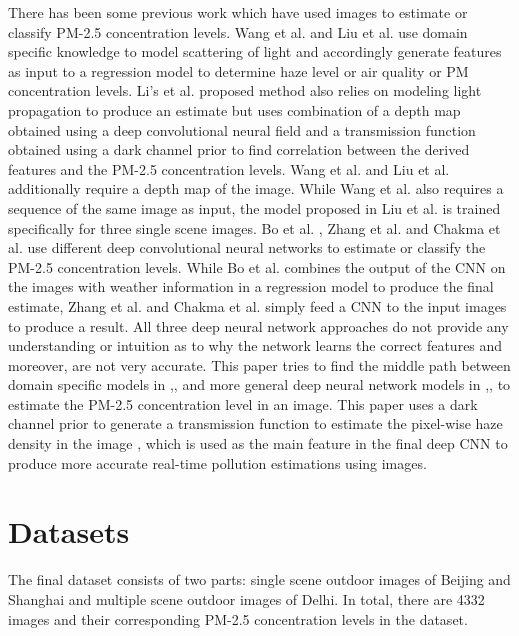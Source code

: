 \documentclass{article}
\begin{document}
There has been some previous work which have used images to estimate or classify PM-2.5 concentration levels. Wang et al. \cite{realtime} and Liu et al. \cite{PP} use domain specific knowledge to model scattering of light and accordingly generate features as input to a regression model to determine haze level or air quality or PM concentration levels. Li’s et al. \cite{Usergen} proposed method also relies on modeling light propagation to produce an estimate but uses combination of a depth map obtained using a deep convolutional neural field and a transmission function obtained using a dark channel prior to find correlation between the derived features and the PM-2.5 concentration levels. Wang et al. \cite{realtime} and Liu et al. \cite{PP} additionally require a depth map of the image. While Wang et al. \cite{realtime} also requires a sequence of the same image as input, the model proposed in Liu et al. \cite{PP} is trained specifically for three single scene images. Bo et al. \cite{PPconv}, Zhang et al. \cite{EAPconv} and Chakma et al. \cite{IBAQconv} use different deep convolutional neural networks to estimate or classify the PM-2.5 concentration levels. While Bo et al. \cite{PPconv} combines the output of the CNN on the images with weather information in a regression model to produce the final estimate, Zhang et al. \cite{EAPconv} and Chakma et al. \cite{EAPconv} simply feed a CNN to the input images to produce a result. All three deep neural network approaches do not provide any understanding or intuition as to why the network learns the correct features and moreover, are not very accurate.
This paper tries to find the middle path between domain specific models in \cite{realtime},\cite{PP},\cite{Usergen} and more general deep neural network models in \cite{PPconv},\cite{EAPconv},\cite{IBAQconv} to estimate the PM-2.5 concentration level in an image. This paper uses a dark channel prior to generate a transmission function to estimate the pixel-wise haze density in the image \cite{dcp}, which is used as the main feature in the final deep CNN to produce more accurate real-time pollution estimations using images.

\section{Datasets}
\label{sec:Datasets} 
The final dataset consists of two parts: single scene outdoor images of Beijing and Shanghai and multiple scene outdoor images of Delhi. In total, there are 4332 images and their corresponding PM-2.5 concentration levels in the dataset.
\end{document}
